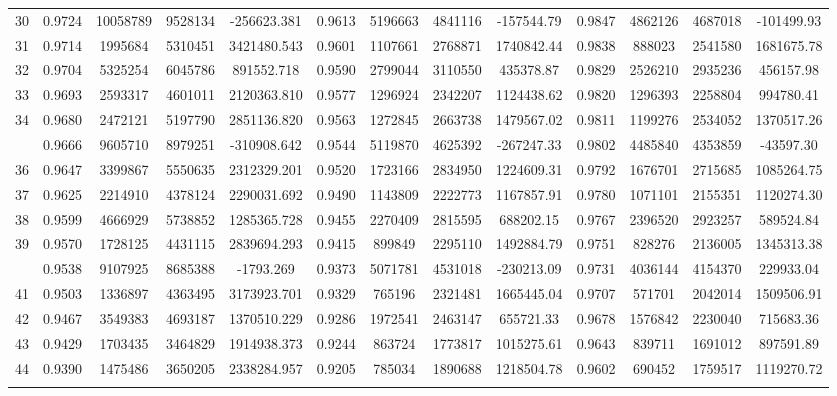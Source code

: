 \documentclass[
  12pt,
]{article}
\begin{document}
\begin{longtable}[t]{lcccccccccccc}
30 & 0.9724 & 10058789 & 9528134 & -256623.381 & 0.9613 & 5196663 & 4841116 & -157544.79 & 0.9847 & 4862126 & 4687018 & -101499.93\\
31 & 0.9714 & 1995684 & 5310451 & 3421480.543 & 0.9601 & 1107661 & 2768871 & 1740842.44 & 0.9838 & 888023 & 2541580 & 1681675.78\\
32 & 0.9704 & 5325254 & 6045786 & 891552.718 & 0.9590 & 2799044 & 3110550 & 435378.87 & 0.9829 & 2526210 & 2935236 & 456157.98\\
33 & 0.9693 & 2593317 & 4601011 & 2120363.810 & 0.9577 & 1296924 & 2342207 & 1124438.62 & 0.9820 & 1296393 & 2258804 & 994780.41\\
34 & 0.9680 & 2472121 & 5197790 & 2851136.820 & 0.9563 & 1272845 & 2663738 & 1479567.02 & 0.9811 & 1199276 & 2534052 & 1370517.26\\
\addlinespace
35 & 0.9666 & 9605710 & 8979251 & -310908.642 & 0.9544 & 5119870 & 4625392 & -267247.33 & 0.9802 & 4485840 & 4353859 & -43597.30\\
36 & 0.9647 & 3399867 & 5550635 & 2312329.201 & 0.9520 & 1723166 & 2834950 & 1224609.31 & 0.9792 & 1676701 & 2715685 & 1085264.75\\
37 & 0.9625 & 2214910 & 4378124 & 2290031.692 & 0.9490 & 1143809 & 2222773 & 1167857.91 & 0.9780 & 1071101 & 2155351 & 1120274.30\\
38 & 0.9599 & 4666929 & 5738852 & 1285365.728 & 0.9455 & 2270409 & 2815595 & 688202.15 & 0.9767 & 2396520 & 2923257 & 589524.84\\
39 & 0.9570 & 1728125 & 4431115 & 2839694.293 & 0.9415 & 899849 & 2295110 & 1492884.79 & 0.9751 & 828276 & 2136005 & 1345313.38\\
\addlinespace
40 & 0.9538 & 9107925 & 8685388 & -1793.269 & 0.9373 & 5071781 & 4531018 & -230213.09 & 0.9731 & 4036144 & 4154370 & 229933.04\\
41 & 0.9503 & 1336897 & 4363495 & 3173923.701 & 0.9329 & 765196 & 2321481 & 1665445.04 & 0.9707 & 571701 & 2042014 & 1509506.91\\
42 & 0.9467 & 3549383 & 4693187 & 1370510.229 & 0.9286 & 1972541 & 2463147 & 655721.33 & 0.9678 & 1576842 & 2230040 & 715683.36\\
43 & 0.9429 & 1703435 & 3464829 & 1914938.373 & 0.9244 & 863724 & 1773817 & 1015275.61 & 0.9643 & 839711 & 1691012 & 897591.89\\
44 & 0.9390 & 1475486 & 3650205 & 2338284.957 & 0.9205 & 785034 & 1890688 & 1218504.78 & 0.9602 & 690452 & 1759517 & 1119270.72\\
\addlinespace

\end{longtable}
\end{document}

